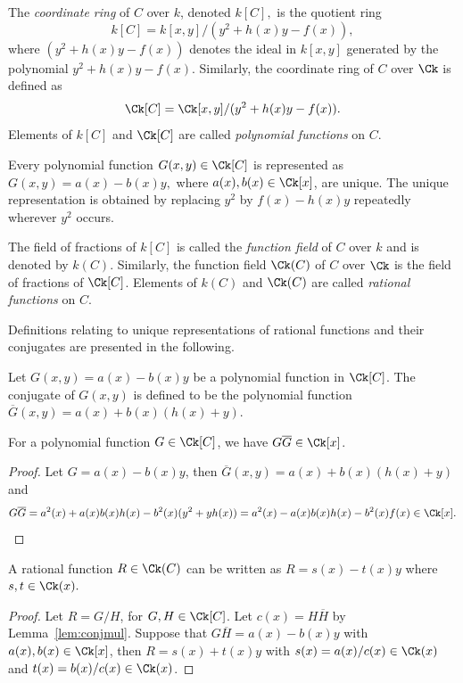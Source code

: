 \bd \label{def:coordring}
\cite[Definition~8]{MenezesWuZuccherato_elementary_1996} The \emph{coordinate
ring} of $C$ over $k$, denoted $k[C],$ is the quotient ring 
$$ k[C] = k[x,y]/(y^2 + h(x)y - f(x)),$$ where $(y^2 + h(x)y - f(x))$ denotes
the ideal in $k[x,y]$ generated by the polynomial $y^2 + h(x)y - f(x)$.
Similarly, the coordinate ring of $C$ over $\Ck$ is defined as $$ \Ck[C] =
\Ck[x,y]/(y^2 + h(x)y -f(x)).$$ Elements of $k[C]$ and $\Ck[C]$ are called
\emph{polynomial functions} on $C$.
\ed

Every polynomial function $G(x,y)\in \Ck[C]$ is represented as $G(x,y) = a(x) -
b(x)y,$ where $a(x),b(x) \in \Ck[x]$, are unique. The unique representation is
obtained by replacing $y^2$ by $f(x) - h(x)y$ repeatedly wherever $y^2$ occurs.

\bd \label{def:functionfield}
\cite[Definition~13]{MenezesWuZuccherato_elementary_1996}  The field of
fractions of $k[C]$ is called the \emph{function field} of $C$ over $k$ and is
denoted by $k(C)$. Similarly, the function field $\Ck(C)$ of $C$ over $\Ck$ is
the field of fractions of $\Ck[C]$. Elements of $k(C)$ and $\Ck(C)$ are called
\emph{rational functions} on $C$.
\ed

Definitions relating to unique representations of rational functions and their
conjugates are presented in the following.

\bd\label{def:polyconj} 
\cite[Adapted from Definition~10]{MenezesWuZuccherato_elementary_1996} Let
$G(x,y) = a(x) - b(x)y$ be a polynomial function in $\Ck[C]$. The conjugate of
$G(x,y)$ is defined to be the polynomial function $\overline{G}(x,y) = a(x) +
b(x)(h(x) + y)$.
\ed

\bl\label{lem:conjmul}
\cite[Adapted from Lemma~12]{MenezesWuZuccherato_elementary_1996} For a
polynomial function $G \in \Ck[C]$, we have $G\overline{G} \in \Ck[x]$.
\begin{proof}
    Let $G = a(x) - b(x)y$, then $\overline{G}(x,y) = a(x) + b(x)(h(x) + y)$ and 
    $$ G\overline{G} = a^2(x) + a(x)b(x)h(x) - b^2(x)(y^2 + yh(x)) = a^2(x) -
    a(x)b(x)h(x) - b^2(x)f(x) \in \Ck[x].$$
\end{proof}
\el

\bl\label{lem:ratform}
A rational function $R \in \Ck(C)$ can be written as $R = s(x) - t(x)y$ where $
s,t \in \Ck(x).$
\begin{proof}
    Let $R = G/H$, for $G,H \in \Ck[C]$. Let $c(x) = H\overline{H}$ by
    Lemma~\ref{lem:conjmul}. Suppose that $G\overline{H} = a(x) - b(x)y$ with
    $a(x),b(x) \in \Ck[x]$, then $R = s(x) + t(x)y$ with $s(x) = a(x)/c(x) \in
    \Ck(x)$ and $t(x) = b(x)/c(x) \in \Ck(x)$.
\end{proof}
\el

